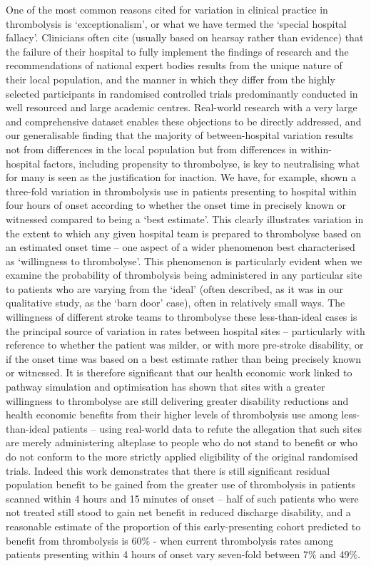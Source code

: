 One of the most common reasons cited for variation in clinical practice in thrombolysis is ‘exceptionalism’, or what we have termed the ‘special hospital fallacy’. Clinicians often cite (usually based on hearsay rather than evidence) that the failure of their hospital to fully implement the findings of research and the recommendations of national expert bodies results from the unique nature of their local population, and the manner in which they differ from the highly selected participants in randomised controlled trials predominantly conducted in well resourced and large academic centres. Real-world research with a very large and comprehensive dataset enables these objections to be directly addressed, and our generalisable finding that the majority of between-hospital variation results not from differences in the local population but from differences in within-hospital factors, including propensity to thrombolyse, is key to neutralising what for many is seen as the justification for inaction. We have, for example, shown a three-fold variation in thrombolysis use in patients presenting to hospital within four hours of onset according to whether the onset time in precisely known or witnessed compared to being a ‘best estimate’. This clearly illustrates variation in the extent to which any given hospital team is prepared to thrombolyse based on an estimated onset time – one aspect of a wider phenomenon best characterised as ‘willingness to thrombolyse’. This phenomenon is particularly evident when we examine the probability of thrombolysis being administered in any particular site to patients who are varying from the ‘ideal’ (often described, as it was in our qualitative study, as the ‘barn door’ case), often in relatively small ways. The willingness of different stroke teams to thrombolyse these less-than-ideal cases is the principal source of variation in rates between hospital sites – particularly with reference to whether the patient was milder, or with more pre-stroke disability, or if the onset time was based on a best estimate rather than being precisely known or witnessed. It is therefore significant that our health economic work linked to pathway simulation and optimisation has shown that sites with a greater willingness to thrombolyse are still delivering greater disability reductions and health economic benefits from their higher levels of thrombolysis use among less-than-ideal patients – using real-world data to refute the allegation that such sites are merely administering alteplase to people who do not stand to benefit or who do not conform to the more strictly applied eligibility of the original randomised trials. Indeed this work demonstrates that there is still significant residual population benefit to be gained from the greater use of thrombolysis in patients scanned within 4 hours and 15 minutes of onset – half of such patients who were not treated still stood to gain net benefit in reduced discharge disability, and a reasonable estimate of the proportion of this early-presenting cohort predicted to benefit from thrombolysis is 60\% - when current thrombolysis rates among patients presenting within 4 hours of onset vary seven-fold between 7\% and 49\%.

